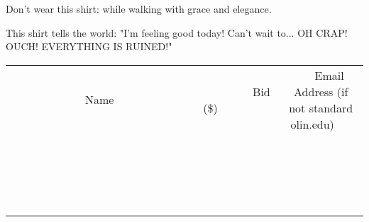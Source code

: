 \documentclass[11pt]{article}
\begin{document}
Don't wear this shirt: while walking with grace and elegance.

This shirt tells the world: "I'm feeling good today! Can't wait to... OH CRAP! OUCH! EVERYTHING IS RUINED!"
\\[3ex]
\begin{tabular}{c c c}
~~~~~~~~~~~~~Name~~~~~~~~~~~~~ & ~~~~~~~~~Bid (\$)~~~~~~~~~  & ~~~Email Address (if not standard olin.edu)~~~\\
 & & \\
\hline
 & & \\
\hline
 & & \\
\hline
 & & \\
\hline
 & & \\
\hline
 & & \\
\hline
 & & \\
\hline
 & & \\
\hline
 & & \\
\hline
 & & \\
\hline
 & & \\
\hline
 & & \\
\hline
 & & \\
\hline
 & & \\
\hline
 & & \\
\hline
 & & \\
\hline
 & & \\
\hline
 & & \\
\hline
 & & \\
\hline
\end{tabular}
\newpage
\end{document}
